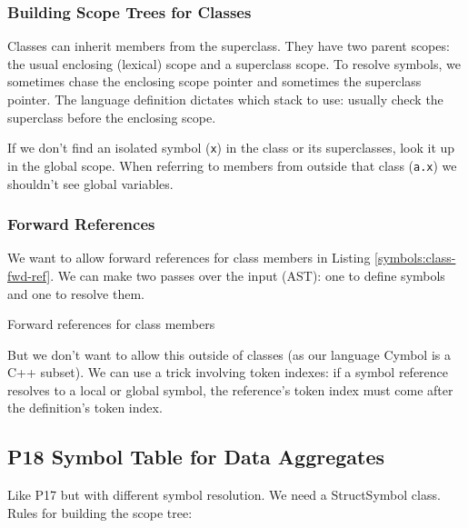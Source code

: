 \subsubsection{Building Scope Trees for Classes}

Classes can inherit members from the superclass.
They have two parent scopes:
the usual enclosing (lexical) scope and a superclass scope.
To resolve symbols, we sometimes chase the enclosing scope pointer
and sometimes the superclass pointer.
The language definition dictates which stack to use:
usually check the superclass before the enclosing scope.

If we don't find an isolated symbol (\verb=x=)
in the class or its superclasses,
look it up in the global scope.
When referring to members from outside that class (\verb=a.x=)
we shouldn't see global variables.


\subsubsection{Forward References}

We want to allow forward references for class members
in Listing \ref{symbols:class-fwd-ref}.
We can make two passes over the input (AST):
one to define symbols and one to resolve them.

\begin{program}
\caption{Forward references for class members\label{symbols:class-fwd-ref}}
\end{program}

But we don't want to allow this outside of classes
(as our language Cymbol is a C++ subset).
We can use a trick involving token indexes:
if a symbol reference resolves to a local or global symbol,
the reference's token index must come after the definition's token index.


\subsection{P18 Symbol Table for Data Aggregates}

Like P17 but with different symbol resolution. We need a StructSymbol class.
Rules for building the scope tree:


